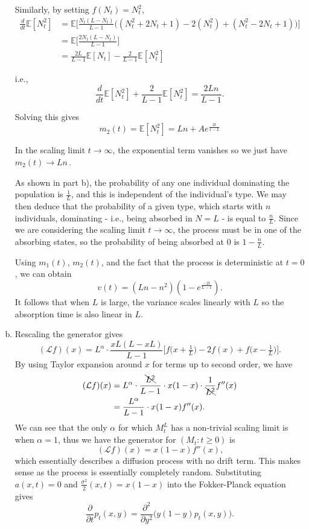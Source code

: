 \documentclass[12pt, twoside, a4paper]{article}
\newcommand{\Gen}{\mathcal{L}}
\begin{document}
\begin{enumerate}[a)]
Similarly, by setting $f(N_t) = N_t^2$, 
\begin{align*}
\frac{d}{dt} \mathbb{E} [N_t^2] 
&= \mathbb{E} \bigg[ \frac{N_t (L-N_t)}{L-1} \bigg( (N_t^2 + 2 N_t +1) - 2(N_t^2) + (N_t^2 - 2 N_t +1) \bigg) \bigg] \\
&= \mathbb{E} \bigg[ \frac{2 N_t (L - N_t)}{L-1} \bigg]\\
&= \frac{2L}{L-1} \mathbb{E} [N_t] - \frac{2}{L-1} \mathbb{E} [N_t^2]
\end{align*}

i.e., 
\[
\frac{d}{dt} \mathbb{E} [N_t^2] + \frac{2}{L-1} \mathbb{E} [N_t^2] = \frac{2Ln}{L-1} \text{.}
\]

Solving this gives
\[
m_2(t) = \mathbb{E} [N_t^2] = Ln + Ae^{\frac{2t}{1-L}}
\]

In the scaling limit $t \to \infty$, the exponential term vanishes so we just have $m_2(t) \to Ln \,$. 

As shown in part b), the probability of any one individual dominating the population is $\tfrac{1}{L}$, and this is independent of the individual's type. We may then deduce that the probability of a given type, which starts with $n$ individuals, dominating - i.e., being absorbed in $N = L$ - is equal to $\tfrac{n}{L}$. Since we are considering the scaling limit $t \to \infty$, the process must be in one of the absorbing states, so the probability of being absorbed at 0 is $1-\tfrac{n}{L}$.

Using $m_1(t)$, $m_2(t)$, and the fact that the process is deterministic at $t=0$, we can obtain 
\[
v(t) = (Ln-n^2)(1- e^{\frac{-2t}{L-1}}) \text{.}
\]
It follows that when $L$ is large, the variance scales linearly with $L$ so the absorption time is also linear in $L$. 

\item
Rescaling the generator gives
\[
(\Gen f) (x) = L^\alpha \cdot \frac{xL(L-xL)}{L-1} \bigg[ f \big( x+\tfrac{1}{L} \big) - 2f(x) + f \big( x-\tfrac{1}{L} \big) \bigg] \text{.}
\]
By using Taylor expansion around $x$ for terms up to second order, we have 
\begin{align*}
(\Gen f) (x) &= L^\alpha \cdot \frac{\bcancel{L^2}}{L-1} \cdot x(1-x) \cdot \frac{1}{\bcancel{L^2}} f''(x)\\
&= \frac{L^\alpha}{L-1} \cdot x(1-x) f''(x) \text{.}
\end{align*}
We can see that the only $\alpha$ for which $M_t^L$ has a non-trivial scaling limit is when $\alpha = 1$, thus we have the generator for $(M_t : t \geq 0)$ is 
\[
(\Gen f) (x) = x(1-x) f''(x) \text{,}
\]
which essentially describes a diffusion process with no drift term. This makes sense as the process is essentially completely random. Substituting $a(x, t) = 0$ and $\tfrac{\sigma ^2}{2} (x, t) = x(1-x)$ into the Fokker-Planck equation gives
\[
\frac{\partial}{\partial t} p_t(x, y) = \frac{\partial ^2}{\partial y^2} \big( y(1-y)p_t(x, y) \big) \text{.}
\]


\end{enumerate}
\end{document}
